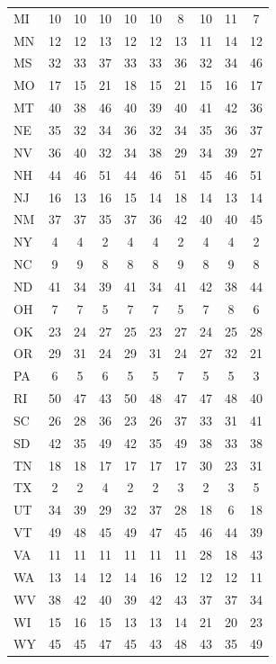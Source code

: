 \documentclass{article}
\begin{document}
\begin{table}[H]
\begin{tabular}{l*{9}{c}}
MI & 10 & 10 & 10 & 10 & 10 & 8 & 10 & 11 & 7 \\
MN & 12 & 12 & 13 & 12 & 12 & 13 & 11 & 14 & 12 \\
MS & 32 & 33 & 37 & 33 & 33 & 36 & 32 & 34 & 46 \\
MO & 17 & 15 & 21 & 18 & 15 & 21 & 15 & 16 & 17 \\
MT & 40 & 38 & 46 & 40 & 39 & 40 & 41 & 42 & 36 \\
NE & 35 & 32 & 34 & 36 & 32 & 34 & 35 & 36 & 37 \\
NV & 36 & 40 & 32 & 34 & 38 & 29 & 34 & 39 & 27 \\
NH & 44 & 46 & 51 & 44 & 46 & 51 & 45 & 46 & 51 \\
NJ & 16 & 13 & 16 & 15 & 14 & 18 & 14 & 13 & 14 \\
NM & 37 & 37 & 35 & 37 & 36 & 42 & 40 & 40 & 45 \\
NY & 4 & 4 & 2 & 4 & 4 & 2 & 4 & 4 & 2 \\
NC & 9 & 9 & 8 & 8 & 8 & 9 & 8 & 9 & 8 \\
ND & 41 & 34 & 39 & 41 & 34 & 41 & 42 & 38 & 44 \\
OH & 7 & 7 & 5 & 7 & 7 & 5 & 7 & 8 & 6 \\
OK & 23 & 24 & 27 & 25 & 23 & 27 & 24 & 25 & 28 \\
OR & 29 & 31 & 24 & 29 & 31 & 24 & 27 & 32 & 21 \\
PA & 6 & 5 & 6 & 5 & 5 & 7 & 5 & 5 & 3 \\
RI & 50 & 47 & 43 & 50 & 48 & 47 & 47 & 48 & 40 \\
SC & 26 & 28 & 36 & 23 & 26 & 37 & 33 & 31 & 41 \\
SD & 42 & 35 & 49 & 42 & 35 & 49 & 38 & 33 & 38 \\
TN & 18 & 18 & 17 & 17 & 17 & 17 & 30 & 23 & 31 \\
TX & 2 & 2 & 4 & 2 & 2 & 3 & 2 & 3 & 5 \\
UT & 34 & 39 & 29 & 32 & 37 & 28 & 18 & 6 & 18 \\
VT & 49 & 48 & 45 & 49 & 47 & 45 & 46 & 44 & 39 \\
VA & 11 & 11 & 11 & 11 & 11 & 11 & 28 & 18 & 43 \\
WA & 13 & 14 & 12 & 14 & 16 & 12 & 12 & 12 & 11 \\
WV & 38 & 42 & 40 & 39 & 42 & 43 & 37 & 37 & 34 \\
WI & 15 & 16 & 15 & 13 & 13 & 14 & 21 & 20 & 23 \\
WY & 45 & 45 & 47 & 45 & 43 & 48 & 43 & 35 & 49 \\
\bottomrule
\end{tabular}
\end{table}
\end{document}
